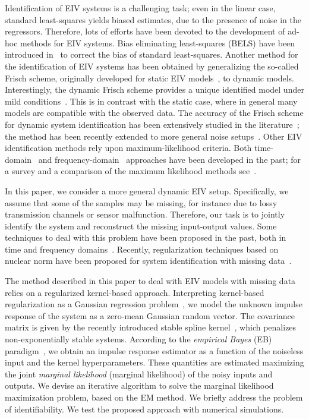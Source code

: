 \documentclass[10pt]{article}
\begin{document}
Identification of EIV systems is a challenging task; even in the linear case,
standard least-squares yields biased estimates, due to the presence of noise in
the regressors. Therefore, lots of efforts have been devoted to the development
of ad-hoc methods for EIV systems. Bias eliminating least-squares (BELS) have
been introduced in~\cite{zheng1989unbiased} to correct the bias of standard
least-squares. Another method for the identification of EIV systems has been
obtained by generalizing the so-called Frisch scheme, originally developed for
static EIV models~\cite{frisch1934statistical}, to dynamic models.
Interestingly, the dynamic Frisch scheme provides a unique identified model
under mild conditions~\cite{beghelli1990frisch}. This is in contrast with the
static case, where in general many models are compatible with the observed data.
The accuracy of the Frisch scheme for dynamic system identification has been
extensively studied in the literature~\cite{soederstroem2002perspectives}; the
method has been recently extended to more general noise
setups~\cite{fan2010frisch,ning2015linear,zhang2015errors}. Other EIV
identification methods rely upon maximum-likelihood criteria. Both
time-domain~\cite{soederstroem1981identification,diversi2007maximum} and
frequency-domain~\cite{schoukens1997frequency} approaches have been developed in
the past; for a survey and a comparison of the maximum likelihood methods
see~\cite{soederstroem2010accuracy}.

In this paper, we consider a more general dynamic EIV setup. Specifically, we
assume  that some of the samples may be missing, for instance due to lossy
transmission channels or sensor malfunction. Therefore, our task is to jointly
identify the system and reconstruct the missing input-output values. Some
techniques to deal with this problem have been proposed in the past, both in
time and frequency
domains~\cite{isaksson1993Identification,pintelon2000frequency,wallin2014maximum,markovsky2015identification,zhang2013errors}.
Recently, regularization techniques based on nuclear norm have been proposed for
system identification with missing
data~\cite{liu2013nuclear,markovsky2013structured}.

The method described in this paper to deal with EIV models with missing data
relies on a regularized kernel-based approach. Interpreting kernel-based
regularization as a  Gaussian regression problem~\cite{rasmussen2006gaussian},
we model the unknown impulse response of the system as a zero-mean Gaussian
random vector. The covariance matrix is given by the recently introduced stable
spline kernel~\cite{pillonetto2010new,pillonetto2014kernel}, which penalizes
non-exponentially stable systems. According to the \emph{empirical Bayes} (EB)
paradigm~\cite{maritz1989empirical}, we obtain an impulse response estimator as
a function of the noiseless input and the kernel hyperparameters. These
quantities are estimated maximizing the joint \emph{marginal likelihood}
(marginal likelihood) of the noisy inputs and outputs. We devise an iterative
algorithm to solve the marginal likelihood maximization problem, based on the EM
method. We briefly address the problem of identifiability. We test the proposed
approach with numerical simulations.
\end{document}
